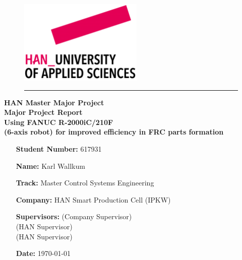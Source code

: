 \begin{titlepage}
	\begin{flushright}
	\begin{minipage}{\linewidth}
		\begin{figure}[H]
			\begin{flushright}
			\includegraphics[width=0.3\linewidth]{Images/HAN_new}
		\end{flushright}
		\hrule
		\end{figure}
	
		\begin{flushright}
			\large\textbf{ HAN Master Major Project}\\
			\vspace{20pt}
			\Huge\textbf{Major Project Report
			\\
			\vspace{10pt}
			Using FANUC R-2000iC/210F\\
			(6-axis robot) for improved efficiency in FRC parts formation }
		\end{flushright}
	
		\vspace{20pt}
		
		\begin{itemize}[leftmargin=4.5cm]
			\LARGE	
			\item[\textbf{Student Number:}] 617931		
			\item[\textbf{Name:}] Karl Wallkum 			
			\item[\textbf{Track:}] Master Control Systems Engineering
			\item[\textbf{Company:}]  HAN Smart Production Cell (IPKW)
			\item[\textbf{Supervisors:}]  \CompanySupervisor (Company Supervisor)\\ \HANSupervisor (HAN Supervisor)\\ \AdditionalSupervisor(HAN Supervisor)			
			\item[\textbf{Date:}] \today	
		\end{itemize}
	\end{minipage}
	\end{flushright}


\end{titlepage}
